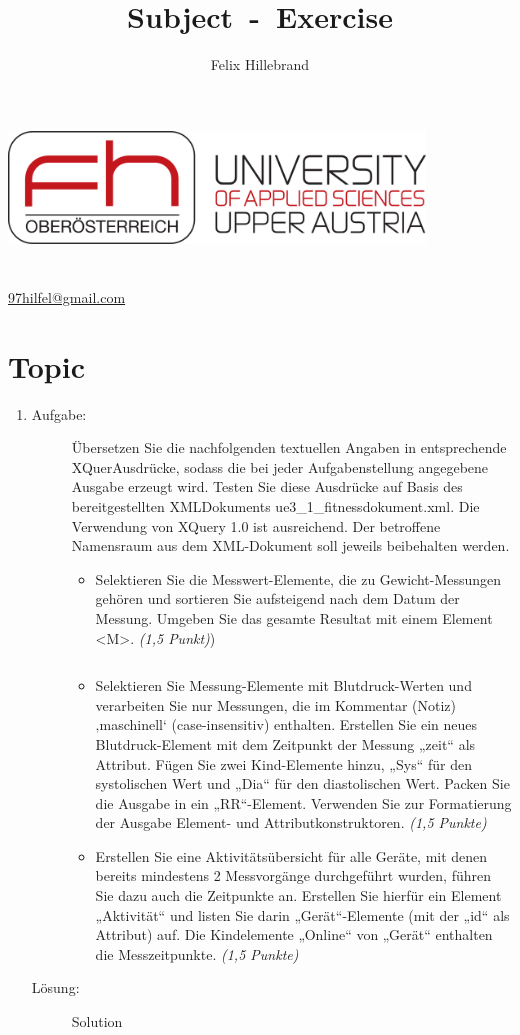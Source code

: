 \documentclass[a4paper,11pt]{report}
\author{Felix Hillebrand}
\makeatletter
\newcommand{\coverpage}{
    \thispagestyle{cover}
    \begin{center}
        {\includegraphics[height=3cm]{fh-logo}}\\[1cm]
        {\LARGE \thetitle}\\[0.5cm]
        {\large \theauthor}\\
        \href{mailto:97hilfel@gmail.com}{97hilfel@gmail.com}\\
    \end{center}
    \tableofcontents
    \clearpage
}
\makeatother
\begin{document}
\title{Subject~-~Exercise}
\coverpage

\clearpage
{}
\pagestyle{main}

\chapter{Topic}
\begin{enumerate}
    \item \label{item:backrefA} \hfill %
    \begin{description}
        \item[Aufgabe:] Übersetzen Sie die nachfolgenden textuellen Angaben in entsprechende XQuer\-Ausdrücke,
        sodass die bei jeder Aufgabenstellung angegebene Ausgabe erzeugt wird.
        Testen Sie diese Ausdrücke auf Basis des bereitgestellten XML\-Dokuments ue3\_1\_fitnessdokument.xml.
        Die Verwendung von XQuery 1.0 ist ausreichend.
        Der betroffene Namensraum aus dem XML-Dokument soll jeweils beibehalten werden.

        \begin{itemize}
        \item Selektieren Sie die Messwert-Elemente,
        die zu Gewicht-Messungen gehören und sortieren Sie aufsteigend nach dem Datum der Messung.
        Umgeben Sie das gesamte Resultat mit einem Element <M>.
        \textit{(1,5 Punkt)})

        \inputminted{xquery}{assets/ue3_1_1.xquery}

        \item Selektieren Sie Messung-Elemente mit Blutdruck-Werten und verarbeiten Sie nur Messungen,
        die im Kommentar (Notiz) ‚maschinell‘ (case-insensitiv) enthalten.
        Erstellen Sie ein neues Blutdruck-Element mit dem Zeitpunkt der Messung „zeit“ als Attribut.
        Fügen Sie zwei Kind-Elemente hinzu, „Sys“ für den systolischen Wert und „Dia“ für den diastolischen Wert.
        Packen Sie die Ausgabe in ein „RR“-Element. Verwenden Sie zur Formatierung der Ausgabe Element- und Attributkonstruktoren.
        \textit{(1,5 Punkte)}

        \item Erstellen Sie eine Aktivitätsübersicht für alle Geräte,
        mit denen bereits mindestens 2 Messvorgänge durchgeführt wurden,
        führen Sie dazu auch die Zeitpunkte an.
        Erstellen Sie hierfür ein Element „Aktivität“ und listen Sie darin „Gerät“-Elemente (mit der „id“ als Attribut) auf.
        Die Kindelemente „Online“ von „Gerät“ enthalten die Messzeitpunkte.
        \textit{(1,5 Punkte)}
        \end{itemize}

         \hfill
        \item[Lösung:] \hfill \newline %
            Solution
    \end{description}
\end{enumerate}
\end{document}
